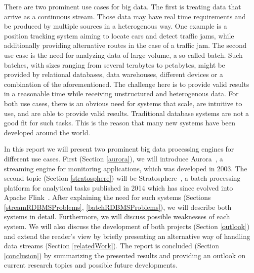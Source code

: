 There are two prominent use cases for big data. The first is treating data that arrive as a continuous stream. Those data may have real time requirements and be produced by multiple sources in a heterogenous way. One example is a position tracking system aiming to locate cars and detect traffic jams, while additionally providing alternative routes in the case of a traffic jam. The second use case is the need for analyzing data of large volume, a so called batch. Such batches, with sizes ranging from several terabytes to petabytes, might be provided by relational databases, data warehouses, different devices or a combination of the aforementioned. The challenge here is to provide valid results in a reasonable time while receiving unstructured and heterogenous data. For both use cases, there is an obvious need for systems that scale, are intuitive to use, and are able to provide valid results. Traditional database systems are not a good fit for such tasks. This is the reason that many new systems have been developed around the world.

In this report we will present two prominent big data processing engines for different use cases. First (Section \ref{aurora}), we will introduce Aurora~\cite{Aurora2003}, a streaming engine for monitoring applications, which was developed in 2003. The second topic (Section \ref{stratosphere}) will be Stratosphere~\cite{Stratosphere2014}, a batch processing platform for analytical tasks published in 2014 which has since evolved into Apache Flink~\cite{Flink2015}. After explaining the need for such systems (Sections \ref{streamRDBMSProblems}, \ref{batchRDBMSProblems}), we will describe both systems in detail. Furthermore, we will discuss possible weaknesses of each system. We will also discuss the development of both projects (Section \ref{outlook}) and extend the reader's view by briefly presenting an alternative way of handling data streams (Section \ref{relatedWork}). The report is concluded (Section \ref{conclusion}) by summarizing the presented results and providing an outlook on current research topics and possible future developments.